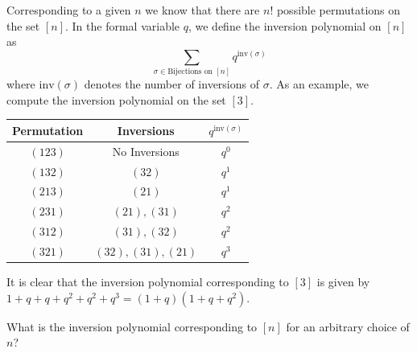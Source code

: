 Corresponding to a given $n$ we know that there are $n!$ possible permutations on the set $[n]$. In the formal variable $q$, we define the inversion polynomial on $[n]$ as \[\sum_{\sigma\in \text{Bijections on }[n]}q^{\text{inv}(\sigma)}\] where $\text{inv}(\sigma)$ denotes the number of inversions of $\sigma$.  As an example, we compute the inversion polynomial on the set $[3]$.
\begin{center}
\begin{tabular}{|c|c|c|}
\hline
\textbf{Permutation} & \textbf{Inversions} & $q^{\text{inv}(\sigma)}$ \\
\hline
$(123)$ & No Inversions & $q^0$ \\
\hline
$(132)$ & $(32)$ & $q^1$ \\
\hline 
$(213)$ & $(21)$ & $q^1$ \\
\hline
$(231)$ & $(21),(31)$ & $q^2$ \\
\hline
$(312)$ & $(31),(32)$ & $q^2$\\
\hline
$(321)$ & $(32),(31),(21)$ & $q^3$\\
\hline
\end{tabular}
\label{tab:S3Example}
\end{center}
It is clear that the inversion polynomial corresponding to $[3]$ is given by $1+q+q+q^2+q^2+q^3=(1+q)(1+q+q^2)$.
\begin{question}
What is the inversion polynomial corresponding to $[n]$ for an arbitrary choice of $n$?
\end{question}
